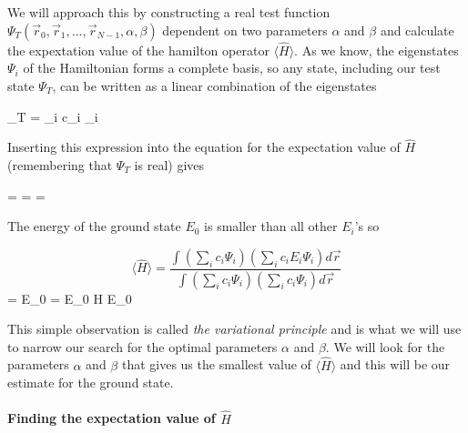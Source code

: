 We will approach this by constructing a real test function $\Psi_T(\vec r_0, \vec r_1, ... , \vec r_{N-1}, \alpha,\beta )$ dependent on two parameters $\alpha$ and $\beta$ and calculate the expextation value of the hamilton operator $\langle \hat{H} \rangle $. 
As we know, the eigenstates $\Psi_i$ of the Hamiltonian forms a complete basis, so any state, including our test state $\Psi_T$, can be written as a linear combination of the eigenstates 

\eqs
\Psi_T = \sum_i c_i \Psi_i
\eqf

Inserting this expression into the equation for the expectation value of $\hat{H}$ (remembering that $\Psi_T$ is real) gives

\eqs
\langle {} \rangle =  = 
=
\eqf

The energy of the ground state $E_0$ is smaller than all other $E_i$'s so 

\[
\langle \hat{H} \rangle
=
\frac{\int \left ( \sum_i c_i \Psi_i \right ) \left ( \sum_i c_i  E_i \Psi_i \right ) d\vec r}{ \int \left ( \sum_i c_i \Psi_i \right ) \left ( \sum_i c_i \Psi_i \right ) d\vec r}
\]
\eqs
\geq
{}
=
E_0
 = E_0
\eqf
\eqs
\langle H \rangle \geq E_0
\eqf

This simple observation is called \textit{the variational principle} and is what we will use to narrow our search for the optimal parameters $\alpha$ and $\beta$.
We will look for the parameters $\alpha$ and $\beta$ that gives us the smallest value of $\langle \hat{H} \rangle$ and this will be our estimate for the ground state.







\paragraph{Finding the expectation value of $\hat{H}$}

